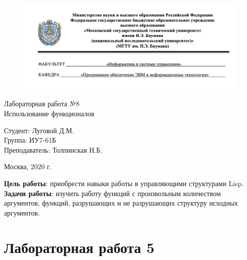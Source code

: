 


	
\begin{figure}[h!]
	\begin{center}
		{\includegraphics[width = \textwidth]{titul.png}}
	\end{center}
\end{figure}

\vspace*{20mm}

\huge
\begin{center}
	Лабораторная работа №8\\
	Использование функционалов
\end{center}


\vspace*{35mm}

\large
\begin{flushleft}
	Студент: Луговой Д.М. \\
	Группа: ИУ7-61Б \\
	Преподаватель: Толпинская Н.Б.
\end{flushleft}

\vspace*{55mm}

\large
\begin{center}
	Москва, 2020 г.
\end{center}

\thispagestyle{empty}

\textbf{Цель работы}: приобрести навыки работы в управляющими структурами Lisp.\\

\textbf{Задачи работы}: изучить работу функций с произвольным количеством аргументов, функций, разрушающих и не разрушающих структуру исходных аргументов.\\

\section*{Лабораторная работа 5}

